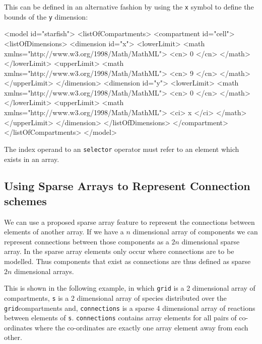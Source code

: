 \documentclass{cekarticle}
\begin{document}
This can be defined in an alternative fashion by using the \texttt{x} symbol to define the bounds of the \texttt{y} dimension:
\begin{example}
<model id="starfish">
    <listOfCompartments>
        <compartment id="cell">
            <listOfDimensions>
                <dimension id="x">
                    <lowerLimit>
                        <math xmlns="http://www.w3.org/1998/Math/MathML">
                            <cn> 0 </cn>
                        </math>
                    </lowerLimit>
                    <upperLimit>
                        <math xmlns="http://www.w3.org/1998/Math/MathML">
                            <cn> 9 </cn>
                        </math>
                    </upperLimit>
                </dimension>
                <dimension id="y">
                    <lowerLimit>
                        <math xmlns="http://www.w3.org/1998/Math/MathML">
                            <cn> 0 </cn>
                        </math>
                    </lowerLimit>
                    <upperLimit>
                        <math xmlns="http://www.w3.org/1998/Math/MathML">
                            <ci> x </ci>
                        </math>
                    </upperLimit>
                </dimension>
            </listOfDimensions>
        </compartment>
    </listOfCompartments>
</model>
\end{example}

The index operand to an \texttt{selector} operator must refer to an element
which exists in an array.  

\subsection{Using Sparse Arrays to Represent Connection schemes}
\label{sec:connections}

We can use a proposed sparse array feature to represent the connections
between elements of another array.  If we have a $n$ dimensional array of
components we can represent connections between those components as a $2 n$ dimensional 
sparse array.  In the sparse array elements only occur where connections are to be modelled.
Thus components that exist as connections are thus defined as sparse $2 n$ dimensional arrays.

This is shown in the
following example, in which \texttt{grid} is a 2 dimensional
array of compartments, \texttt{s} is a 2 dimensional array of
species distributed over the \texttt{grid}compartments and, \texttt{connections} is a sparse 4
dimensional array of reactions between elements of \texttt{s}.
\texttt{connections} contains array elements for all
pairs of co-ordinates where the co-ordinates are exactly one array element
away from each other.
\end{document}
